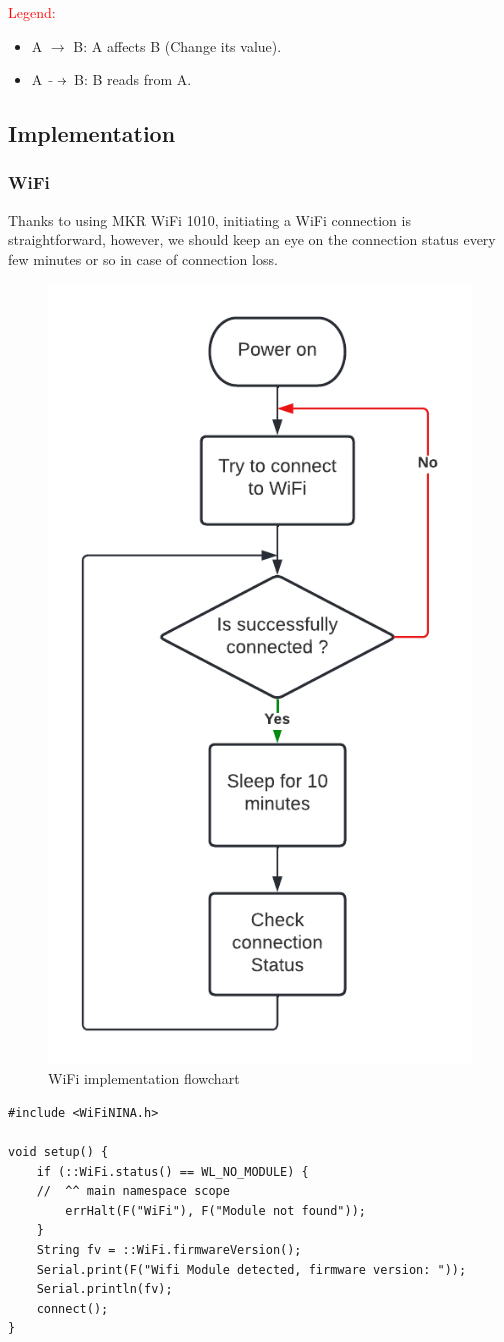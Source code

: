 \textcolor{red}{Legend:}
\begin{itemize}
    \item A $\longrightarrow$ B: A affects B (Change its value).
    \item A $\dashto$ B: B reads from A.
\end{itemize}


\subsection{Implementation}

\subsubsection{WiFi}
Thanks to using MKR WiFi 1010, initiating a WiFi connection is straightforward, however, we should keep an eye on the connection status every few minutes or so in case of connection loss.
\begin{figure}[H]
    \centering
    \includegraphics[width=.4\textwidth]{images/central/wifi_flowchart.png}
    \caption{WiFi implementation flowchart}
\end{figure}

\begin{code}
\caption{WiFi first connection implementation}
\begin{verbatim}
#include <WiFiNINA.h>

void setup() {
    if (::WiFi.status() == WL_NO_MODULE) {
    //  ^^ main namespace scope
        errHalt(F("WiFi"), F("Module not found"));
    }
    String fv = ::WiFi.firmwareVersion();
    Serial.print(F("Wifi Module detected, firmware version: "));
    Serial.println(fv);
    connect();
}
\end{verbatim}
\end{code}


